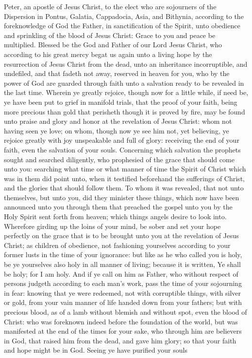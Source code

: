 


Peter, an apostle of Jesus Christ, to the elect who are sojourners of the Dispersion in Pontus, Galatia, Cappadocia, Asia, and Bithynia, according to the foreknowledge of God the Father, in sanctification of the Spirit, unto obedience and sprinkling of the blood of Jesus Christ: Grace to you and peace be multiplied.  Blessed be the God and Father of our Lord Jesus Christ, who according to his great mercy begat us again unto a living hope by the resurrection of Jesus Christ from the dead, unto an inheritance incorruptible, and undefiled, and that fadeth not away, reserved in heaven for you, who by the power of God are guarded through faith unto a salvation ready to be revealed in the last time. Wherein ye greatly rejoice, though now for a little while, if need be, ye have been put to grief in manifold trials, that the proof of your faith, being more precious than gold that perisheth though it is proved by fire, may be found unto praise and glory and honor at the revelation of Jesus Christ: whom not having seen ye love; on whom, though now ye see him not, yet believing, ye rejoice greatly with joy unspeakable and full of glory: receiving the end of your faith, even the salvation of your souls. Concerning which salvation the prophets sought and searched diligently, who prophesied of the grace that should come unto you: searching what time or what manner of time the Spirit of Christ which was in them did point unto, when it testified beforehand the sufferings of Christ, and the glories that should follow them. To whom it was revealed, that not unto themselves, but unto you, did they minister these things, which now have been announced unto you through them that preached the gospel unto you by the Holy Spirit sent forth from heaven; which things angels desire to look into.  Wherefore girding up the loins of your mind, be sober and set your hope perfectly on the grace that is to be brought unto you at the revelation of Jesus Christ; as children of obedience, not fashioning yourselves according to your former lusts in the time of your ignorance: but like as he who called you is holy, be ye yourselves also holy in all manner of living; because it is written, Ye shall be holy; for I am holy. And if ye call on him as Father, who without respect of persons judgeth according to each man’s work, pass the time of your sojourning in fear: knowing that ye were redeemed, not with corruptible things, with silver or gold, from your vain manner of life handed down from your fathers; but with precious blood, as of a lamb without blemish and without spot, even the blood of Christ: who was foreknown indeed before the foundation of the world, but was manifested at the end of the times for your sake, who through him are believers in God, that raised him from the dead, and gave him glory; so that your faith and hope might be in God. Seeing ye have purified your souls 